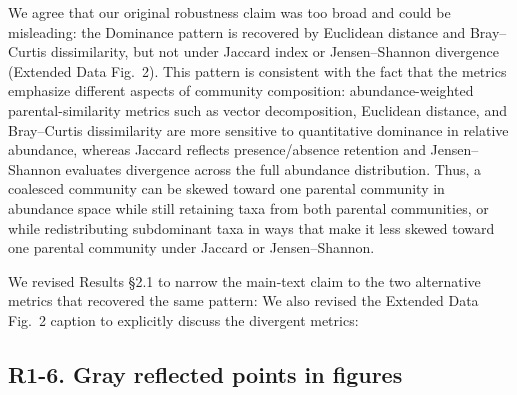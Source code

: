 \responselabel
We agree that our original robustness claim was too broad and could be misleading: the Dominance pattern is recovered by Euclidean distance and Bray--Curtis dissimilarity, but not under Jaccard index or Jensen--Shannon divergence (Extended Data Fig.~2). This pattern is consistent with the fact that the metrics emphasize different aspects of community composition: abundance-weighted parental-similarity metrics such as vector decomposition, Euclidean distance, and Bray--Curtis dissimilarity are more sensitive to quantitative dominance in relative abundance, whereas Jaccard reflects presence/absence retention and Jensen--Shannon evaluates divergence across the full abundance distribution. Thus, a coalesced community can be skewed toward one parental community in abundance space while still retaining taxa from both parental communities, or while redistributing subdominant taxa in ways that make it less skewed toward one parental community under Jaccard or Jensen--Shannon.

We revised Results \S2.1 to narrow the main-text claim to the two alternative metrics that recovered the same pattern:  We also revised the Extended Data Fig.~2 caption to explicitly discuss the divergent metrics: 


\subsection*{R1-6. Gray reflected points in figures}

